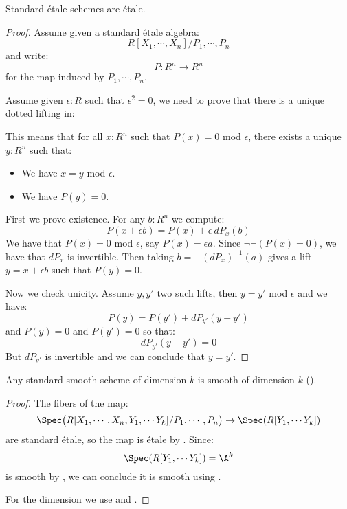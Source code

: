 \begin{lemma}\label{standard-etale-are-etale}
Standard étale schemes are étale.
\end{lemma}

\begin{proof}
Assume given a standard étale algebra:
\[R[X_1,\cdots,X_n]/P_1,\cdots,P_n\]
and write:
\[P:R^n\to R^n\]
for the map induced by $P_1,\cdots,P_n$.

Assume given $\epsilon:R$ such that $\epsilon^2=0$, we need to prove that there is a unique dotted lifting in:
  \begin{center}
    \end{center}
This means that for all $x:R^n$ such that $P(x)=0$ mod $\epsilon$, there exists a unique $y:R^n$ such that:
\begin{itemize} 
\item We have $x=y$ mod $\epsilon$.
\item We have $P(y)=0$.
\end{itemize}

First we prove existence. For any $b:R^n$ we compute:
\[P(x+\epsilon b) = P(x) + \epsilon\ dP_x(b)\]
We have that $P(x)=0$ mod $\epsilon$, say $P(x) = \epsilon a$. Since $\neg\neg(P(x) = 0)$, we have that $dP_x$ is invertible. Then taking $b = -(dP_x)^{-1}(a)$ gives a lift $y=x+\epsilon b$ such that $P(y) = 0$.

Now we check unicity. Assume $y,y'$ two such lifts, then $y=y'$ mod $\epsilon$ and we have:
\[P(y) = P(y') + dP_{y'}(y-y')\]
and $P(y)=0$ and $P(y')=0$ so that:
\[dP_{y'}(y-y') = 0\]
But $dP_{y'}$ is invertible and we can conclude that $y=y'$.
\end{proof}

\begin{lemma}\label{standard-smooth-is-smooth}
Any standard smooth scheme of dimension $k$ is smooth of dimension $k$ ().
\end{lemma}

\begin{proof}
The fibers of the map:
\[\Spec\big(R[X_1,\cdots,X_n,Y_1,\cdots Y_{k}] / P_1,\cdots,P_n\big) \to \Spec(R[Y_1,\cdots Y_{k}])\]
are standard étale, so the map is étale by . Since:
\[\Spec(R[Y_1,\cdots Y_{k}]) = \A^k\]
is smooth by , we can conclude it is smooth using . 

For the dimension we use  and .
\end{proof}



